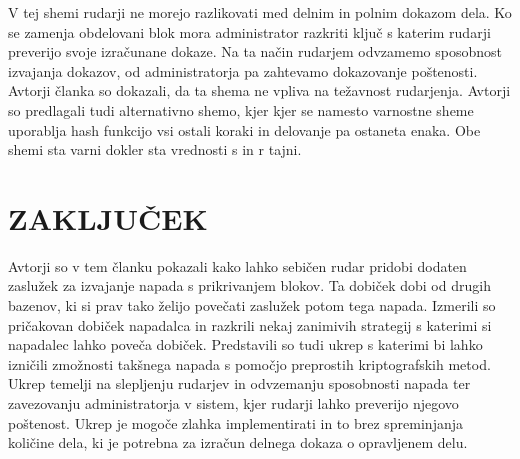 \documentclass{acm_proc_article-sp}
\begin{document}
V tej shemi rudarji ne morejo razlikovati med delnim in polnim dokazom dela. Ko se zamenja obdelovani blok mora administrator razkriti ključ s katerim rudarji preverijo svoje izračunane dokaze. Na ta način rudarjem odvzamemo sposobnost izvajanja dokazov, od administratorja pa zahtevamo dokazovanje poštenosti. Avtorji članka so dokazali, da ta shema ne vpliva na težavnost rudarjenja. Avtorji so predlagali tudi alternativno shemo, kjer kjer se namesto varnostne sheme uporablja hash funkcijo vsi ostali koraki in delovanje pa ostaneta enaka. Obe shemi sta varni dokler sta vrednosti s in r tajni.

\section{ZAKLJUČEK}
Avtorji so v tem članku pokazali kako lahko sebičen rudar pridobi dodaten zaslužek za izvajanje napada s prikrivanjem blokov. Ta dobiček dobi od drugih bazenov, ki si prav tako želijo povečati zaslužek potom tega napada. Izmerili so pričakovan dobiček napadalca in razkrili nekaj zanimivih strategij s katerimi si napadalec lahko poveča dobiček. Predstavili so tudi ukrep s katerimi bi lahko izničili zmožnosti takšnega napada s pomočjo preprostih kriptografskih metod. Ukrep temelji na slepljenju rudarjev in odvzemanju sposobnosti napada ter zavezovanju administratorja v sistem, kjer rudarji lahko preverijo njegovo poštenost. Ukrep je mogoče zlahka implementirati in to brez spreminjanja količine dela, ki je potrebna za izračun delnega dokaza o opravljenem delu.
\end{document}
